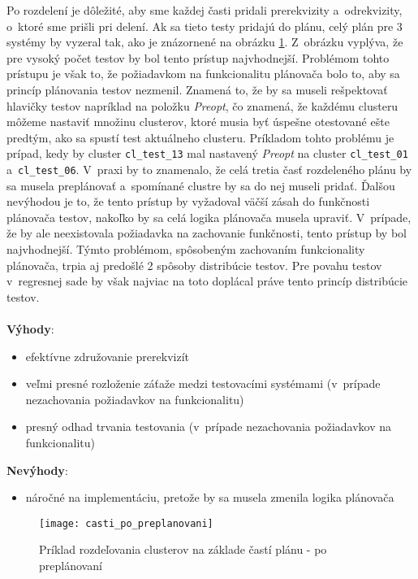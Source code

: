 Po rozdelení je dôležité, aby sme každej časti pridali prerekvizity 
a~odrekvizity, o~ktoré sme prišli pri delení. Ak sa tieto testy pridajú 
do plánu, celý plán pre 3 systémy by vyzeral tak, ako je znázornené na 
obrázku \ref{obrazok:distribucia_casti_po_preplanovani}.
Z~obrázku vyplýva, že pre vysoký počet testov by bol tento prístup 
najvhodnejší. Problémom tohto prístupu je však to, že požiadavkom na 
funkcionalitu plánovača bolo to, aby sa princíp plánovania testov nezmenil. 
Znamená to, že by sa museli rešpektovať hlavičky testov napríklad na 
položku \emph{Preopt}, čo znamená, že každému clusteru môžeme nastaviť 
množinu clusterov, ktoré musia byť úspešne otestované ešte predtým, 
ako sa spustí test aktuálneho clusteru.
Príkladom tohto problému je prípad, kedy by cluster \texttt{cl\_test\_13} 
mal nastavený \textit{Preopt} na cluster \texttt{cl\_test\_01} 
a~\texttt{cl\_test\_06}.
V~praxi by to znamenalo, že celá tretia časť rozdeleného plánu by sa 
musela preplánovať a~spomínané clustre by sa do nej museli pridať. 
Ďalšou nevýhodou je to, že tento prístup by vyžadoval väčší zásah do 
funkčnosti plánovača testov, nakoľko by sa celá logika plánovača musela upraviť.
V~prípade, že by ale neexistovala požiadavka na zachovanie funkčnosti, 
tento prístup by bol najvhodnejší. Týmto problémom, spôsobeným zachovaním 
funkcionality plánovača, trpia aj predošlé 2 spôsoby distribúcie testov. 
Pre povahu testov v~regresnej sade by však najviac na toto doplácal 
práve tento princíp distribúcie testov.  
\\
\\
\noindent \textbf{Výhody}:
\begin{itemize}
\item efektívne združovanie prerekvizít
\item veľmi presné rozloženie záťaže medzi testovacími systémami 
(v~prípade nezachovania požiadavkov na funkcionalitu)
\item presný odhad trvania testovania 
(v~prípade nezachovania požiadavkov na funkcionalitu)
\end{itemize} 

\noindent \textbf{Nevýhody}:
\begin{itemize}
\item náročné na implementáciu, pretože by sa musela zmenila logika plánovača
\end{itemize}

\begin{figure}[h]
  \begin{center}
    \texttt{[image: casti\_po\_preplanovani]}
    \caption{Príklad rozdeľovania clusterov na základe častí plánu
             - po preplánovaní}
    \label{obrazok:distribucia_casti_po_preplanovani}
  \end{center}
\end{figure}

